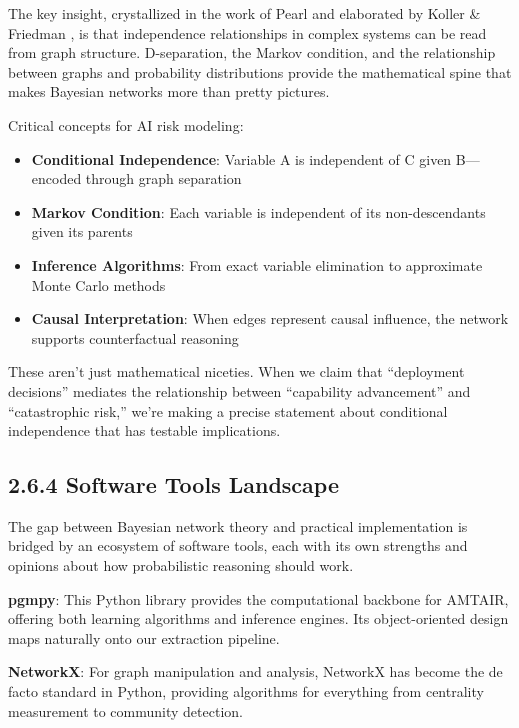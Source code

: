 \documentclass[
  11pt,
  letterpaper,
  openany]{book}
\providecommand{\tightlist}{%
  \setlength{\itemsep}{0pt}\setlength{\parskip}{0pt}}
\begin{document}
The key insight, crystallized in the work of Pearl \textcite{pearl2014}
and elaborated by Koller \& Friedman \textcite{koller2009}, is that
independence relationships in complex systems can be read from graph
structure. D-separation, the Markov condition, and the relationship
between graphs and probability distributions provide the mathematical
spine that makes Bayesian networks more than pretty pictures.

Critical concepts for AI risk modeling:

\begin{itemize}
\tightlist
\item
  \textbf{Conditional Independence}: Variable A is independent of C
  given B---encoded through graph separation
\item
  \textbf{Markov Condition}: Each variable is independent of its
  non-descendants given its parents
\item
  \textbf{Inference Algorithms}: From exact variable elimination to
  approximate Monte Carlo methods
\item
  \textbf{Causal Interpretation}: When edges represent causal influence,
  the network supports counterfactual reasoning
\end{itemize}

These aren't just mathematical niceties. When we claim that ``deployment
decisions'' mediates the relationship between ``capability advancement''
and ``catastrophic risk,'' we're making a precise statement about
conditional independence that has testable implications.

\subsection{2.6.4 Software Tools Landscape}\label{sec-software-tools}

The gap between Bayesian network theory and practical implementation is
bridged by an ecosystem of software tools, each with its own strengths
and opinions about how probabilistic reasoning should work.

\textbf{pgmpy}: This Python library provides the computational backbone
for AMTAIR, offering both learning algorithms and inference engines. Its
object-oriented design maps naturally onto our extraction pipeline.

\textbf{NetworkX}: For graph manipulation and analysis, NetworkX has
become the de facto standard in Python, providing algorithms for
everything from centrality measurement to community detection.
\end{document}
